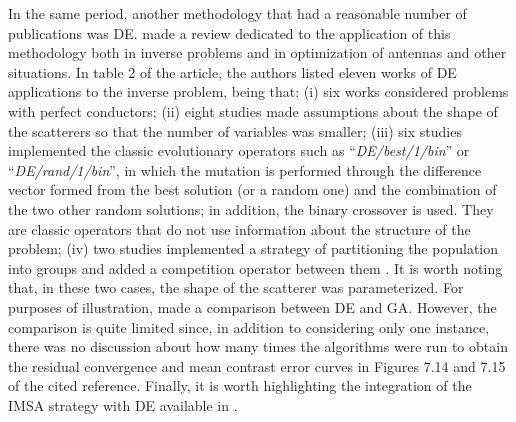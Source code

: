 			In the same period, another methodology that had a reasonable number of publications was DE. \cite{rocca2011differential} made a review dedicated to the application of this methodology both in inverse problems and in optimization of antennas and other situations. In table 2 of the article, the authors listed eleven works of DE applications to the inverse problem, being that: (i) six works considered problems with perfect conductors; (ii) eight studies made assumptions about the shape of the scatterers so that the number of variables was smaller; (iii) six studies implemented the classic evolutionary operators such as ``\textit{DE/best/1/bin}'' or ``\textit{DE/rand/1/bin}'', in which the mutation is performed through the difference vector formed from the best solution (or a random one) and the combination of the two other random solutions; in addition, the binary crossover is used. They are classic operators that do not use information about the structure of the problem; (iv) two studies implemented a strategy of partitioning the population into groups and added a competition operator between them \citep{qing2003electromagnetic,breard2008hybrid}. It is worth noting that, in these two cases, the shape of the scatterer was parameterized. For purposes of illustration, \cite{pastorino2010} made a comparison between DE and GA. However, the comparison is quite limited since, in addition to considering only one instance, there was no discussion about how many times the algorithms were run to obtain the residual convergence and mean contrast error curves in Figures 7.14 and 7.15 of the cited reference. Finally, it is worth highlighting the integration of the IMSA strategy with DE available in \citep{donelli2010differential}.
			
